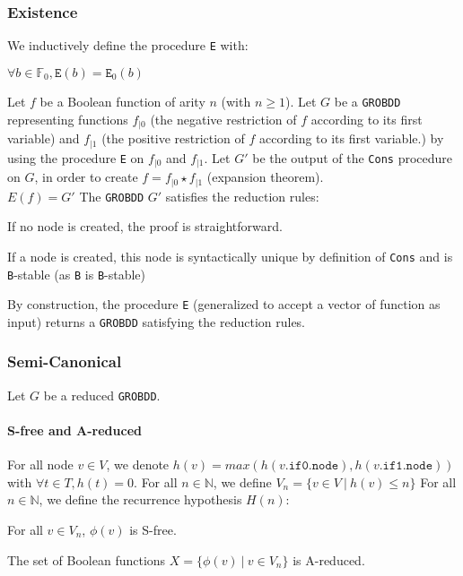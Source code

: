 \documentclass[a4paper,10pt]{article}
\newcommand{\N}{\mathbb{N}}%
\newcommand{\F}{\mathbb{F}}
\newcommand{\GroBdd}{\texttt{GROBDD}}
\newcommand{\fieldNode}{\texttt{node}}
\newcommand{\fieldThen}{\mathtt{if1}}
\newcommand{\fieldElse}{\mathtt{if0}}
\newcommand\restr[2]{{#1}_{\left|{#2}\right.}}
\begin{document}
\subsubsection{Existence}
We inductively define the procedure \texttt{E} with: \begin{compactitem}
\item $\forall b\in\F_0, \texttt{E}(b) = \texttt{E}_0(b)$
\item
Let $f$ be a Boolean function of arity $n$ (with $n \geq 1$).
Let $G$ be a \GroBdd{} representing functions $\restr{f}{0}$ (the negative restriction of $f$ according to its first variable) and $\restr{f}{1}$ (the positive restriction of $f$ according to its first variable.) by using the procedure \texttt{E} on $\restr{f}{0}$ and $\restr{f}{1}$.
Let $G'$ be the output of the \texttt{Cons} procedure on $G$, in order to create $f = \restr{f}{0} \star \restr{f}{1}$ (expansion theorem).\\
$E(f) = G'$
The \GroBdd{} $G'$ satisfies the reduction rules: \begin{compactitem}
\item If no node is created, the proof is straightforward.
\item If a node is created, this node is syntactically unique by definition of \texttt{Cons} and is \texttt{B}-stable (as \texttt{B} is \texttt{B}-stable)
\end{compactitem}
\end{compactitem}

By construction, the procedure \texttt{E} (generalized to accept a vector of function as input) returns a \GroBdd{} satisfying the reduction rules.

\subsubsection{Semi-Canonical}

Let $G$ be a reduced \GroBdd{}.

\paragraph{S-free and A-reduced}
For all node $v\in V$, we denote $h(v) = max(h(v.\fieldElse{}.\fieldNode{}), h(v.\fieldThen{}.\fieldNode{}))$ with $\forall t\in T, h(t) = 0$.
For all $n\in\N$, we define $V_n = \{v\in V ~|~ h(v) \leq n\}$
For all $n\in\N$, we define the recurrence hypothesis $H(n)$: \begin{compactitem}
\item For all $v\in V_n$, $\phi(v)$ is S-free.
\item The set of Boolean functions $X = \{\phi(v) ~|~ v\in V_n\}$ is A-reduced.
\end{compactitem}
\end{document}
